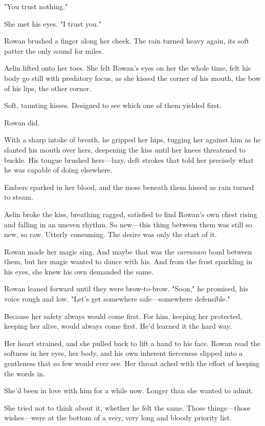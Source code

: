 "You trust nothing."

She met his eyes. "I trust you."

Rowan brushed a finger along her cheek. The rain turned heavy again, its soft patter the only sound for miles.

Aelin lifted onto her toes. She felt Rowan's eyes on her the whole time, felt his body go still with predatory focus, as she kissed the corner of his mouth, the bow of his lips, the other corner.

Soft, taunting kisses. Designed to see which one of them yielded first.

Rowan did.

With a sharp intake of breath, he gripped her hips, tugging her against him as he slanted his mouth over hers, deepening the kiss until her knees threatened to buckle. His tongue brushed hers---lazy, deft strokes that told her precisely what he was capable of doing elsewhere.

Embers sparked in her blood, and the moss beneath them hissed as rain turned to steam.

Aelin broke the kiss, breathing ragged, satisfied to find Rowan's own chest rising and falling in an uneven rhythm. So new---this thing between them was still so new, so  raw. Utterly consuming. The desire was only the start of it.

Rowan made her magic sing. And maybe that was the \emph{carranam} bond between them, but  her magic wanted to dance with his. And from the frost sparkling in his eyes, she knew his own demanded the same.

Rowan leaned forward until they were brow-to-brow. "Soon," he promised, his voice rough and low. "Let's get somewhere safe---somewhere defensible."

Because her safety always would come first. For him, keeping her protected, keeping her alive, would always come first. He'd learned it the hard way.

Her heart strained, and she pulled back to lift a hand to his face. Rowan read the softness in her eyes, her body, and his own inherent fierceness slipped into a gentleness that so few would ever see. Her throat ached with the effort of keeping the words in.

She'd been in love with him for a while now. Longer than she wanted to admit.

She tried not to think about it, whether he felt the same. Those things---those wishes---were at the bottom of a very, very long and bloody priority list.

